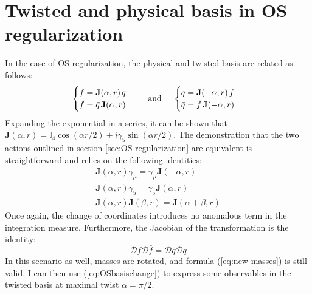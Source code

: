 \documentclass[english, LaM, oneside, noexaminfo]{sapthesis}
\begin{document}
\section{Twisted and physical basis in OS regularization}
\noindent
In the case of OS regularization, the physical and twisted basis are related as follows:
\begin{equation*}\label{eq:OSbasischange}
    \begin{cases}
        f =  \mathbf{J}(\alpha, r)\hspace*{.5mm} q \\
        \bar f = \bar q \hspace*{.5mm} \mathbf{J}(\alpha, r)
    \end{cases}
    \quad \text{ and } \quad
    \begin{cases}
        q =  \mathbf{J}(-\alpha, r)\hspace*{.5mm} f \\
        \bar q = \bar f \hspace*{.5mm} \mathbf{J}(-\alpha, r)
    \end{cases}
\end{equation*}
Expanding the exponential in a series, it can be shown that $\mathbf{J} (\alpha, r) = \mathbb{I}_4 \cos (\alpha r/2) + i \gamma_5 \sin (\alpha r/2)$.
The demonstration that the two actions outlined in section \ref{sec:OS-regularization} are equivalent is straightforward and relies on the following identities:
\begin{equation*}
    \begin{gathered}
        \mathbf{J}(\alpha,r) \gamma_\mu = \gamma_\mu \mathbf{J}(-\alpha,r) \\
        \mathbf{J}(\alpha,r) \gamma_5 = \gamma_5 \mathbf{J}(\alpha,r) \\
        \mathbf{J}(\alpha,r) \mathbf{J}(\beta,r) = \mathbf{J}(\alpha+\beta,r) 
    \end{gathered}
\end{equation*}
Once again, the change of coordinates introduces no anomalous term in the integration measure.
Furthermore, the Jacobian of the transformation is the identity:
\begin{equation*}
    \mathcal{D} f \mathcal{D} \bar f = \mathcal{D} q \mathcal{D} \bar q
\end{equation*}
In this scenario as well, masses are rotated, and formula (\ref{eq:new-masses}) is still valid.
I can then use (\ref{eq:OSbasischange}) to express some observables in the twisted basis at maximal twist $\alpha = \pi/2$.
\end{document}
